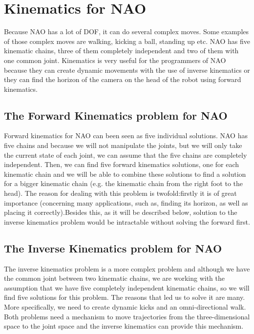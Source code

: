 \newpage
\section{Kinematics for NAO}
Because NAO has a lot of DOF, it can do several complex moves. Some examples of those complex moves are walking, kicking a ball, standing up etc. NAO has five kinematic chains, three of them completely independent and two of them with one common joint. Kinematics is very useful for the programmers of NAO because they can create dynamic movements with the use of inverse kinematics or they can find the horizon of the camera on the head of the robot using forward kinematics.
\subsection{The Forward Kinematics problem for NAO}
Forward kinematics for NAO can been seen as five individual solutions. NAO has five chains and because we will not manipulate the joints, but we will only take the current state of each joint, we can assume that the five chains are completely independent. Then, we can find five forward kinematics solutions, one for each kinematic chain and we will be able to combine these solutions to find a solution for a bigger kinematic chain (e.g. the kinematic chain from the right foot to the head). The reason for dealing with this problem is twofold:firstly it is of great importance (concerning many applications, such as, finding its horizon, as well as placing it correctly).Besides this, as it will be described below, solution to the inverse kinematics problem would be intractable without solving the forward first.

\subsection{The Inverse Kinematics problem for NAO}
The inverse kinematics problem is a more complex problem and although we have the common joint between two kinematic chains, we are working with the assumption that we have five completely independent kinematic chains, so we will find five solutions for this problem. The reasons that led us to solve it are many. More specifically, we need to create dynamic kicks and an omni-directional walk. Both problems need a mechanism to move trajectories from the three-dimensional space to the joint space and the inverse kinematics can provide this mechanism.
